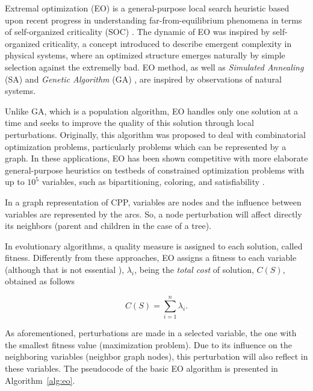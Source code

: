 \documentclass[11pt]{article}
\begin{document}
Extremal optimization (EO) \citep{Boettcher1999,Boettcher2000} is a general-purpose local search 
heuristic based upon recent progress in understanding far-from-equilibrium phenomena in terms of 
self-organized criticality (SOC) \citep{Boettcher2002}. The dynamic of EO was inspired 
by self-organized criticality, a concept introduced to describe emergent complexity in physical
systems, where an optimized structure emerges naturally by simple selection against the extremelly bad.
EO method, as well as {\it Simulated Annealing} (SA) \citep{Kirkpatrick1983} and {\it Genetic Algorithm}
(GA) \citep{Goldberg1989}, are inspired by observations of natural systems.

Unlike GA, which is a population algorithm, EO handles only one solution at a time and 
seeks to improve the quality of this solution through local perturbations. Originally,
this algorithm was proposed to deal with combinatorial optimization problems, particularly
problems which can be represented by a graph. In these applications, EO has been shown
competitive with more elaborate general-purpose heuristics on testbeds of constrained
optimization problems with up to $10^5$ variables, such as bipartitioning, coloring,
and satisfiability \citep{Boettcher2002}.

In a graph representation of CPP, variables are nodes and the influence between variables 
are represented by the arcs. So, a node perturbation will affect directly its neighbors
(parent and children in the case of a tree).

In evolutionary algorithms, a quality measure is assigned to each solution, called fitness. 
Differently from these approaches, EO assigns a fitness to each variable (although that is 
not essential \citep{Boettcher2000}), $\lambda_i$, being the \emph{total cost} of solution, 
$C(S)$, obtained as follows

\begin{equation}
C(S) = \sum_{i=1}^{n} \lambda_i.
\end{equation}

As aforementioned, perturbations are made in a selected variable, the one with the smallest fitness 
value (maximization problem). Due to its influence on the neighboring variables (neighbor graph nodes),
this perturbation will also reflect in these variables. The pseudocode of the basic EO algorithm is 
presented in Algorithm~\ref{alg:eo}.\\
\end{document}
